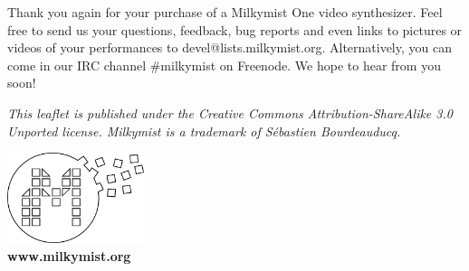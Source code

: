 \documentclass{leaflet}
\begin{document}
Thank you again for your purchase of a Milkymist One video synthesizer. Feel free to send us your questions, feedback, bug reports and even links to pictures or videos of your performances to \hbox{devel@lists.milkymist.org}. Alternatively, you can come in our IRC channel \#milkymist on Freenode. We hope to hear from you soon!

\textit{This leaflet is published under the Creative Commons Attribution-ShareAlike 3.0 Unported license. Milkymist is a trademark of S\'ebastien Bourdeauducq.}

\begin{center}
\includegraphics[width=40mm]{logo.pdf} \\
\textbf{www.milkymist.org}
\end{center}
\end{document}
